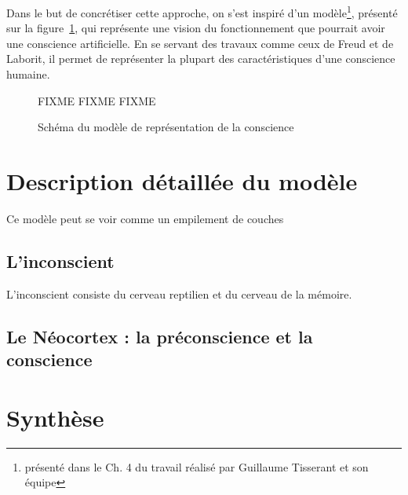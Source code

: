 Dans le but de concrétiser cette approche, on
s'est inspiré d'un modèle\footnote{présenté dans le Ch. 4 du travail réalisé par
\mbox{Guillaume} \mbox{Tisserant} et son équipe}, présenté sur la
figure~\ref{modele_original}, qui représente une vision du fonctionnement que
pourrait avoir une conscience artificielle. En se servant des travaux comme ceux
de Freud et de Laborit, il permet de représenter la plupart des caractéristiques
d’une conscience humaine.

\begin{figure}[H] 
\centering
FIXME FIXME FIXME
\caption{Schéma du modèle de représentation de la conscience} 
\label{modele_original}
\end{figure}

\section{Description détaillée du modèle}
Ce modèle peut se voir comme un empilement de couches
\subsection{L’inconscient}
L'inconscient consiste du cerveau reptilien et du cerveau de la mémoire.
\subsection{Le Néocortex : la préconscience et la conscience}

\section{Synthèse}
